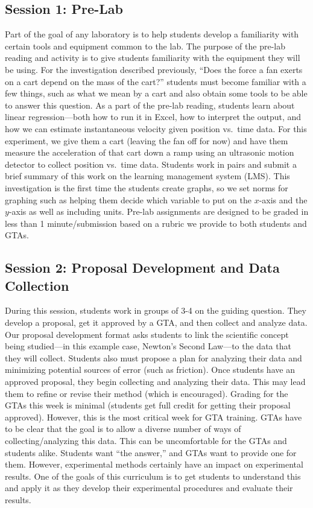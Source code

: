 \documentclass[aip, numerical, preprint]{revtex4-2}
\begin{document}
\subsection{Session 1: Pre-Lab}
Part of the goal of any laboratory is to help students develop a familiarity with certain tools
and equipment common to the lab.  The purpose of the pre-lab reading and activity is to give
students familiarity with the equipment they will be using.  For the investigation described
previously, ``Does the force a fan exerts on a cart depend on the mass of the cart?''  students 
must become familiar with a few things, such as what we mean by a cart and also obtain some 
tools to be able to answer this question.  As a part of the pre-lab
reading, students learn about linear regression---both how to run it in Excel,
how to interpret the output, and how we can estimate instantaneous velocity given position
vs.\ time data. For this experiment, we give them a cart (leaving the fan off for now) and have
them measure the acceleration of that cart down a ramp using an ultrasonic motion detector to
collect position vs.\ time data.  Students work in pairs and submit a brief
summary of this work on the learning management system (LMS). This investigation is the first
time the students create graphs, so we set norms for graphing such as helping them decide which
variable to put on the $x$-axis and the $y$-axis as well as including units.  Pre-lab assignments
are designed to be graded in less than 1 minute/submission based on a rubric we provide to both
students and GTAs.

\subsection{Session 2: Proposal Development and Data Collection}
During this session, students work in groups of 3-4 on the guiding question.  They develop a
proposal, get it approved by a GTA, and then collect and analyze data.  Our proposal development 
format asks students to link the scientific concept being studied---in
this example case, Newton's Second Law---to the data that they will collect.  Students also
must propose a plan for analyzing their data and minimizing potential sources of error (such
as friction).  Once students have an approved proposal, they begin collecting and analyzing
their data.  This may lead them to refine or revise their method (which is encouraged).  Grading 
for the GTAs this week is minimal (students get full credit for getting their
proposal approved).  However, this is the most critical week for GTA training.  GTAs have to be
clear that the goal is to allow a diverse number of ways of collecting/analyzing this
data. This can be uncomfortable for the GTAs and students alike.  Students want ``the answer,''
and GTAs want to provide one for them.  However, experimental methods certainly have an impact
on experimental results. One of the goals of this curriculum is to get students to understand
this and apply it as they develop their experimental procedures and evaluate their results.
\end{document}

